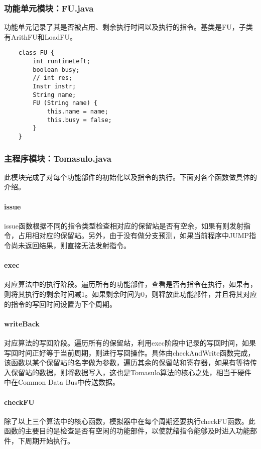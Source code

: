 \documentclass[paper=a4, fontsize=11pt, UTF8]{article} %
\begin{document}
\subsubsection{功能单元模块：FU.java}
功能单元记录了其是否被占用、剩余执行时间以及执行的指令。基类是FU，子类有ArithFU和LoadFU。

\begin{lstlisting}
    class FU {
        int runtimeLeft;
        boolean busy;
        // int res;
        Instr instr;
        String name;
        FU (String name) {
            this.name = name;
            this.busy = false;
        }
    }
\end{lstlisting}

\subsubsection{主程序模块：Tomasulo.java}
此模块完成了对每个功能部件的初始化以及指令的执行。下面对各个函数做具体的介绍。
\paragraph{issue}
issue函数根据不同的指令类型检查相对应的保留站是否有空余，如果有则发射指令，占用相对应的保留站。另外，由于没有做分支预测，如果当前程序中JUMP指令尚未返回结果，则直接无法发射指令。

\paragraph{exec}
对应算法中的执行阶段。遍历所有的功能部件，查看是否有指令在执行，如果有，则将其执行的剩余时间减1。如果剩余时间为0，则释放此功能部件，并且将其对应的指令的写回时间设置为下个周期。

\paragraph{writeBack}
对应算法的写回阶段。遍历所有的保留站，利用exec阶段中记录的写回时间，如果写回时间正好等于当前周期，则进行写回操作。具体由checkAndWrite函数完成，该函数以某个保留站的名字做为参数，遍历其余的保留站和寄存器，如果有等待传入保留站的数据，则将数据写入，这也是Tomasulo算法的核心之处，相当于硬件中在Common Data Bus中传送数据。

\paragraph{checkFU}
除了以上三个算法中的核心函数，模拟器中在每个周期还要执行checkFU函数。此函数的主要目的是检查是否有空闲的功能部件，以使就绪指令能够及时进入功能部件，下周期开始执行。
\end{document}
